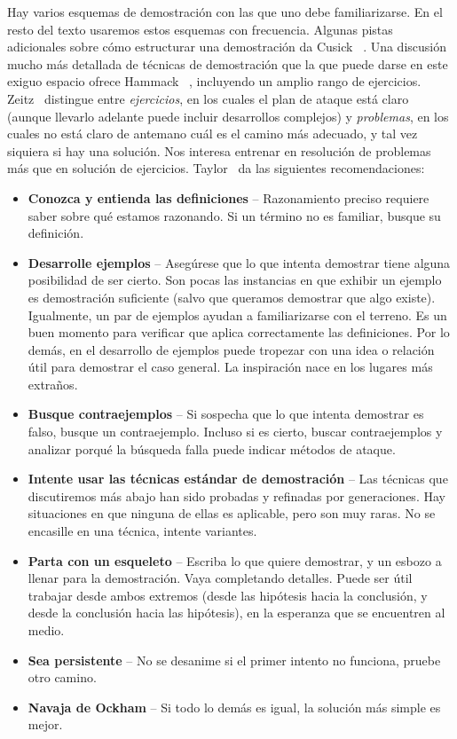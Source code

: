   Hay varios esquemas de demostración
  con las que uno debe familiarizarse.
  En el resto del texto usaremos estos esquemas con frecuencia.
  Algunas pistas adicionales sobre cómo estructurar una demostración
  da Cusick~%
    \cite{cusick:_how_write_proofs}.
  Una discusión mucho más detallada de técnicas de demostración
  que la que puede darse en este exiguo espacio ofrece Hammack~%
    \cite{hammack13:_book_proof},
  incluyendo un amplio rango de ejercicios.
  Zeitz~\cite{zeitz07:_art_craft_probl_solving}
  distingue entre \emph{ejercicios},
  en los cuales el plan de ataque está claro
  (aunque llevarlo adelante puede incluir desarrollos complejos)
  y \emph{problemas},
  en los cuales no está claro de antemano cuál es el camino más adecuado,
  y tal vez siquiera si hay una solución.
  Nos interesa entrenar en resolución de problemas
  más que en solución de ejercicios.
  Taylor~\cite{taylor07:_introd_proof}
  da las siguientes recomendaciones:
  \begin{itemize}
  \item \textbf{Conozca y entienda las definiciones} --
    Razonamiento preciso requiere saber sobre qué estamos razonando.
    Si un término no es familiar,
    busque su definición.
  \item \textbf{Desarrolle ejemplos} --
    Asegúrese que lo que intenta demostrar
    tiene alguna posibilidad de ser cierto.
    Son pocas las instancias en que exhibir un ejemplo
    es demostración suficiente
    (salvo que queramos demostrar que algo existe).
    Igualmente,
    un par de ejemplos ayudan a familiarizarse con el terreno.
    Es un buen momento para verificar
    que aplica correctamente las definiciones.
    Por lo demás,
    en el desarrollo de ejemplos puede tropezar con una idea
    o relación útil
    para demostrar el caso general.
    La inspiración nace en los lugares más extraños.
  \item \textbf{Busque contraejemplos} --
    Si sospecha que lo que intenta demostrar es falso,
    busque un contraejemplo.
    Incluso si es cierto,
    buscar contraejemplos y analizar porqué la búsqueda falla
    puede indicar métodos de ataque.
  \item \textbf{Intente usar las técnicas estándar de demostración} --
    Las técnicas que discutiremos más abajo
    han sido probadas y refinadas
    por generaciones.
    Hay situaciones en que ninguna de ellas es aplicable,
    pero son muy raras.
    No se encasille en una técnica,
    intente variantes.
  \item \textbf{Parta con un esqueleto} --
    Escriba lo que quiere demostrar,
    y un esbozo a llenar para la demostración.
    Vaya completando detalles.
    Puede ser útil trabajar desde ambos extremos
    (desde las hipótesis hacia la conclusión,
     y desde la conclusión hacia las hipótesis),
    en la esperanza que se encuentren al medio.
  \item \textbf{Sea persistente} --
    No se desanime si el primer intento no funciona,
    pruebe otro camino.
  \item \textbf{Navaja de Ockham} --
    Si todo lo demás es igual,
    la solución más simple es mejor.
  \end{itemize}


